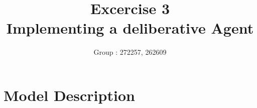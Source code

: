 \documentclass[11pt]{article}
\title{\bf Excercise 3\\ Implementing a deliberative Agent}
\author{Group \textnumero : 272257, 262609}
\begin{document}
\maketitle

\section{Model Description}
\end{document}
